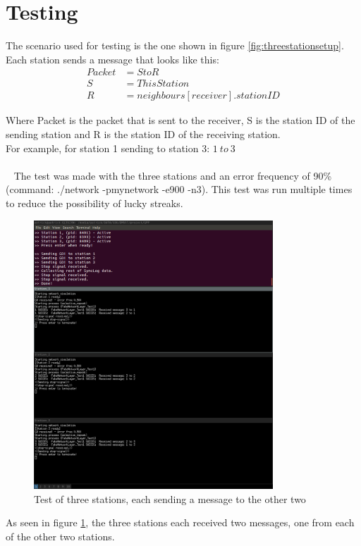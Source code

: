 \section{Testing}
The scenario used for testing is the one shown in figure \ref{fig:threestationsetup}.\\
Each station sends a message that looks like this:
\begin{align*}
Packet &= S to R\\
S &= ThisStation\\
R &= neighbours[receiver].stationID
\end{align*}

Where Packet is the packet that is sent to the receiver, S is the station ID of the sending station and R is the station ID of the receiving station.\\
For example, for station 1 sending to station 3: $1\ to\ 3$\\
\\~
The test was made with the three stations and an error frequency of 90\% (command: ./network -pmynetwork -e900 -n3). This test was run multiple times to reduce the possibility of lucky streaks.
\begin{figure}[H]
\centering
\includegraphics[width=0.8\textwidth]{Test1.png}
\caption{Test of three stations, each sending a message to the other two}
\label{fig:threestationtest}
\end{figure}

As seen in figure \ref{fig:threestationtest}, the three stations each received two messages, one from each of the other two stations.



